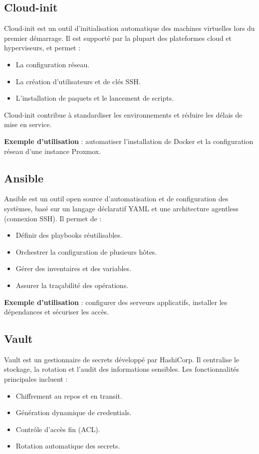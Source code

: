 \subsection{Cloud-init}

Cloud-init est un outil d’initialisation automatique des machines virtuelles lors du premier démarrage. Il est supporté par la plupart des plateformes cloud et hyperviseurs, et permet :
\begin{itemize}
    \item La configuration réseau.
    \item La création d’utilisateurs et de clés SSH.
    \item L’installation de paquets et le lancement de scripts.
\end{itemize}

Cloud-init contribue à standardiser les environnements et réduire les délais de mise en service.

\textbf{Exemple d’utilisation} : automatiser l’installation de Docker et la configuration réseau d’une instance Proxmox.

\subsection{Ansible}

Ansible est un outil open source d’automatisation et de configuration des systèmes, basé sur un langage déclaratif YAML et une architecture agentless (connexion SSH). Il permet de :
\begin{itemize}
    \item Définir des playbooks réutilisables.
    \item Orchestrer la configuration de plusieurs hôtes.
    \item Gérer des inventaires et des variables.
    \item Assurer la traçabilité des opérations.
\end{itemize}

\textbf{Exemple d’utilisation} : configurer des serveurs applicatifs, installer les dépendances et sécuriser les accès.

\subsection{Vault}

Vault est un gestionnaire de secrets développé par HashiCorp. Il centralise le stockage, la rotation et l’audit des informations sensibles. Les fonctionnalités principales incluent :
\begin{itemize}
    \item Chiffrement au repos et en transit.
    \item Génération dynamique de credentials.
    \item Contrôle d’accès fin (ACL).
    \item Rotation automatique des secrets.
\end{itemize}

